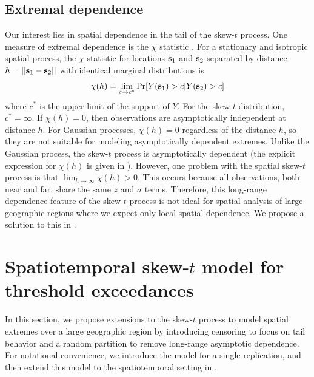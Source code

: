 \documentclass[useAMS,usenatbib,referee]{biom}
\begin{document}
\subsection{Extremal dependence}\label{sts:extdep}
Our interest lies in spatial dependence in the tail of the skew-$t$ process.
One measure of extremal dependence is the $\chi$ statistic \citep{Coles1999}.
For a stationary and isotropic spatial process, the $\chi$ statistic for locations $\mbox{\bf s}_1$ and $\mbox{\bf s}_2$ separated by distance $h = || \mbox{\bf s}_1 - \mbox{\bf s}_2 ||$ with identical marginal distributions is
\begin{align} \label{steq:chih}
  \chi(h) = \lim_{c \rightarrow c^*} \Pr[Y(\bs_1) > c | Y(\bs_2) > c]
\end{align}
where $c^*$ is the upper limit of the support of $Y$.
For the skew-$t$ distribution, $c^* = \infty$.
If $\chi(h) = 0$, then observations are asymptotically independent at distance $h$.
For Gaussian processes, $\chi(h) = 0$ regardless of the distance $h$, so they are not suitable for modeling asymptotically dependent extremes.
Unlike the Gaussian process, the skew-$t$ process is asymptotically dependent (the explicit expression for $\chi(h)$ is given in ).
However, one problem with the spatial skew-$t$ process is that $\lim_{h \rightarrow \infty} \chi(h) > 0$.
This occurs because all observations, both near and far, share the same $z$ and $\sigma$ terms.
Therefore, this long-range dependence feature of the skew-$t$ process is not ideal for spatial analysis of large geographic regions where we expect only local spatial dependence.
We propose a solution to this in .

\section{Spatiotemporal skew-$t$ model for threshold exceedances}\label{sts:spatial}
In this section, we propose extensions to the skew-$t$ process to model spatial extremes over a large geographic region by introducing censoring to focus on tail behavior and a random partition to remove long-range asymptotic dependence.
For notational convenience, we introduce the model for a single replication, and then extend this model to the spatiotemporal setting in .
\end{document}
